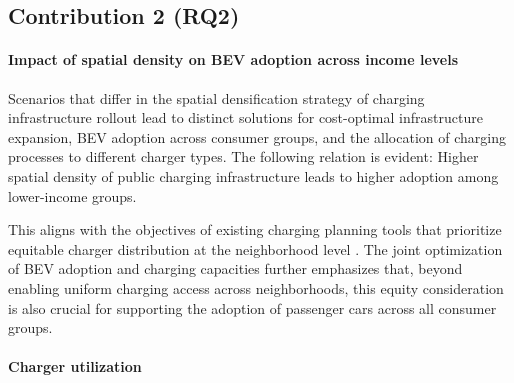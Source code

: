 \newpage

\subsection{Contribution 2 (RQ2)}
\noindent{}

\noindent{}
\paragraph*{Impact of spatial density on \ac{BEV} adoption across income levels}

Scenarios that differ in the spatial densification strategy of charging infrastructure rollout lead to distinct solutions for cost-optimal infrastructure expansion, \ac{BEV} adoption across consumer groups, and the allocation of charging processes to different charger types. The following relation is evident: Higher spatial density of public charging infrastructure leads to higher adoption among lower-income groups. 

This aligns with the objectives of existing charging planning tools that prioritize equitable charger distribution at the neighborhood level \citep{BATIC2025135834, info16110933}. The joint optimization of \ac{BEV} adoption and charging capacities further emphasizes that, beyond enabling uniform charging access across neighborhoods, this equity consideration is also crucial for supporting the adoption of passenger cars across all consumer groups. 




\paragraph*{Charger utilization}

